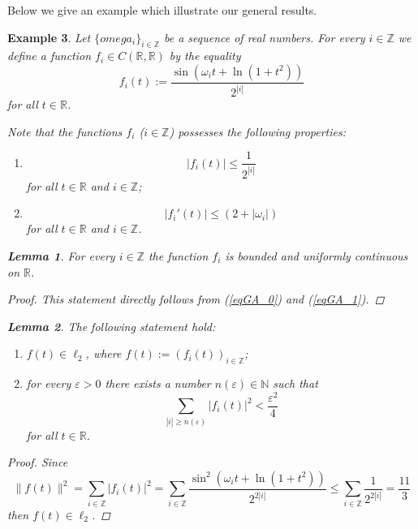 \documentclass{amsart}%
\newtheorem{lemma}{Lemma}[section]
\newtheorem{example}[lemma]{Example}
\begin{document}
Below we give an example which illustrate our general results.

\begin{example}\label{exGA1} Let $\{omega_{i}\}_{i\in \mathbb Z}$ be a
sequence of real numbers. For every $i\in \mathbb Z$ we define a
function $f_{i}\in C(\mathbb R,\mathbb R)$ by the equality
\begin{equation}\label{eqGA1}
f_{i}(t):=\frac{\sin(\omega_{i}t+\ln(1+t^{2}))}{2^{|i|}} \nonumber
\end{equation}
for all $t\in \mathbb R$.

Note that the functions $f_{i}$ ($i\in \mathbb Z$) possesses the
following properties:
\begin{enumerate}
\item
\begin{equation}\label{eqGA_0}
|f_{i}(t)|\le \frac{1}{2^{|i|}}
\end{equation}
for all $t\in \mathbb R$ and $i\in \mathbb Z$; \item
\begin{equation}\label{eqGA_1}
|f_{i}'(t)|\le (2+|\omega_{i}|)
\end{equation}
for all $t\in \mathbb R$ and $i\in \mathbb Z$.
\end{enumerate}

\begin{lemma}\label{lGA_1} For every $i\in \mathbb Z$ the
function $f_{i}$ is bounded and uniformly continuous on $\mathbb
R$.
\end{lemma}
\begin{proof} This statement directly follows from (\ref{eqGA_0})
and (\ref{eqGA_1}).
\end{proof}

\begin{lemma}\label{lGA1} The following statement hold:
\begin{enumerate}
\item $f(t)\in \ell_{2}$, where $f(t):=(f_{i}(t))_{i\in \mathbb
Z}$; \item for every $\varepsilon >0$ there exists a number
$n(\varepsilon)\in \mathbb N$ such that
\begin{equation}\label{eqGA2}
\sum\limits_{|i|\ge
n(\varepsilon)}|f_{i}(t)|^{2}<\frac{\varepsilon^{2}}{4}
\end{equation}
for all $t\in \mathbb R$.
\end{enumerate}
\end{lemma}
\begin{proof} Since
\begin{equation}\label{eqGA3}
\|f(t)\|^{2}=\sum\limits_{i\in \mathbb
Z}|f_{i}(t)|^{2}=\sum\limits_{i\in \mathbb
Z}\frac{\sin^{2}(\omega_{i}t+\ln(1+t^{2}))}{2^{2|i|}}\le
\sum\limits_{i\in \mathbb Z}\frac{1}{2^{2|i|}}=\frac{11}{3}
\nonumber
\end{equation}
then $f(t)\in \ell_{2}$.


\end{proof}
\end{example}
\end{document}
